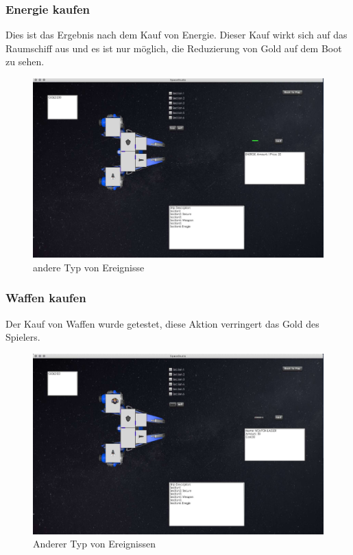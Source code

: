 \documentclass[12pt]{article}
\begin{document}
\subsubsection{Energie kaufen}
Dies ist das Ergebnis nach dem Kauf von Energie. Dieser Kauf wirkt sich auf das Raumschiff aus und es ist nur möglich, die Reduzierung von Gold auf dem Boot zu sehen.
\begin{figure}[htp]
\centering
\includegraphics[scale=0.4]{TestProtocolBilder/energie.jpg}
\caption{andere Typ von Ereignisse}
\end{figure}
\newpage
\subsubsection{Waffen kaufen}
Der Kauf von Waffen wurde getestet, diese Aktion verringert das Gold des Spielers.    
\begin{figure}[htp]
\centering
\includegraphics[scale=0.4]{TestProtocolBilder/weaponkaufen.jpg}
\caption{Anderer Typ von Ereignissen}
\end{figure}
\newpage
\end{document}
